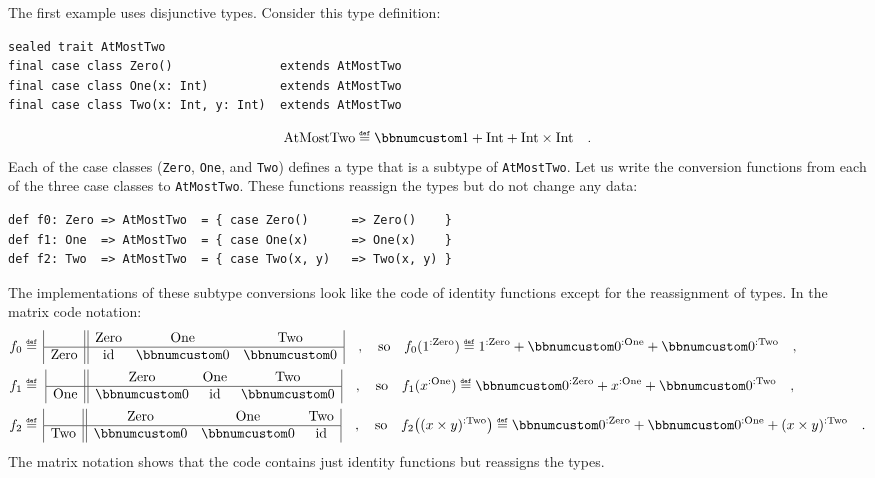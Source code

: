 The first example uses disjunctive types. Consider this type definition:
\begin{lstlisting}
sealed trait AtMostTwo
final case class Zero()               extends AtMostTwo
final case class One(x: Int)          extends AtMostTwo
final case class Two(x: Int, y: Int)  extends AtMostTwo
\end{lstlisting}
\[
\text{AtMostTwo}\triangleq\bbnum 1+\text{Int}+\text{Int}\times\text{Int}\quad.
\]
Each of the case classes (\lstinline!Zero!, \lstinline!One!, and
\lstinline!Two!) defines a type that is a subtype of \lstinline!AtMostTwo!.
Let us write the conversion functions from each of the three case
classes to \lstinline!AtMostTwo!. These functions reassign the types
but do not change any data:
\begin{lstlisting}
def f0: Zero => AtMostTwo  = { case Zero()      => Zero()    }
def f1: One  => AtMostTwo  = { case One(x)      => One(x)    }
def f2: Two  => AtMostTwo  = { case Two(x, y)   => Two(x, y) }
\end{lstlisting}
The implementations of these subtype conversions look like the code
of identity functions except for the reassignment of types. In the
matrix code notation:{\small{}
\begin{align*}
f_{0} & \triangleq\,\begin{array}{|c||ccc|}
 & \text{Zero} & \text{One} & \text{Two}\\
\hline \text{Zero} & \text{id} & \bbnum 0 & \bbnum 0
\end{array}\quad,\quad\text{so}\quad f_{0}(1^{:\text{Zero}})\triangleq1^{:\text{Zero}}+\bbnum 0^{:\text{One}}+\bbnum 0^{:\text{Two}}\quad,\\
f_{1} & \triangleq\,\,\begin{array}{|c||ccc|}
 & \text{Zero} & \text{One} & \text{Two}\\
\hline \text{One} & \bbnum 0 & \text{id} & \bbnum 0
\end{array}\quad,\quad\text{so}\quad f_{1}(x^{:\text{One}})\triangleq\bbnum 0^{:\text{Zero}}+x^{:\text{One}}+\bbnum 0^{:\text{Two}}\quad,\\
f_{2} & \triangleq\,\begin{array}{|c||ccc|}
 & \text{Zero} & \text{One} & \text{Two}\\
\hline \text{Two} & \bbnum 0 & \bbnum 0 & \text{id}
\end{array}\quad,\quad\text{so}\quad f_{2}\big((x\times y)^{:\text{Two}}\big)\triangleq\bbnum 0^{:\text{Zero}}+\bbnum 0^{:\text{One}}+(x\times y)^{:\text{Two}}\quad.
\end{align*}
}The matrix notation shows that the code contains just identity functions
but reassigns the types.

